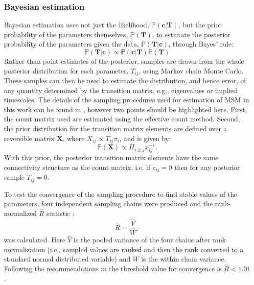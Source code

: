 \subsubsection{Bayesian estimation}\label{sec:theory_bayes}
Bayesian estimation \cite{gelmanBayesianDataAnalysis2014} uses not just the likelihood, $\mathbb{P}(\mathbf{c}|\mathbf{T})$, but the prior probability of the parameters themselves, $\mathbb{P}(\mathbf{T})$, to estimate the posterior probability of the parameters given the data, $\mathbb{P}(\mathbf{T}|\mathbf{c})$, through Bayes' rule: 
\begin{equation}
    \mathbb{P}(\mathbf{T}|\mathbf{c}) \propto \mathbb{P}(\mathbf{c}|\mathbf{T})\mathbb{P}(\mathbf{T})
\end{equation}
Rather than point estimates of the posterior, samples are drawn from the whole posterior distribution for each parameter, $T_{ij}$, using Markov chain Monte Carlo\cite{gelmanBayesianDataAnalysis2014}. These samples can then be used to estimate the distribution, and hence error, of any quantity determined by the transition matrix, e.g., eigenvalues or implied timescales. The details of the sampling procedures used for estimation of MSM in this work can be found in \cite{trendelkamp-schroerEstimationUncertaintyReversible2015b}, however two points should be highlighted here. First, the count matrix used are estimated using the effective count method. Second, the prior distribution for the transition matrix elements are defined over a reversible matrix $\mathbf{X}$, where $X_{ij}\propto T_{ij}\pi_{i}$, and is given by: 
\begin{equation}\label{eqn:theory_rev_prior}
    \mathbb{P}(\mathbf{X}) \propto \Pi_{i \ge j}x_{ij}^{-1}. 
\end{equation}
With this prior, the posterior transition matrix elements have the same connectivity structure as the count matrix. i.e. if $c_{ij}=0$ then for any posterior sample $T_{ij}=0$. 

To test the convergence of the sampling procedure to find stable values of the parameters, four independent sampling chains were produced and  the rank-normalized $\hat{R}$ statistic \cite{vehtariRanknormalizationFoldingLocalization2020}:
\begin{equation}
    \hat{R} = \frac{\hat{V}}{W}, 
\end{equation}
was calculated. Here $\hat{V}$ is the pooled variance of the four chains after rank normalization (i.e., sampled values are ranked and then the rank converted to a standard normal distributed variable) and $W$ is the within chain variance. Following the recommendations in \cite{vehtariRanknormalizationFoldingLocalization2020} the threshold value for convergence is $\hat{R} < 1.01$. 

